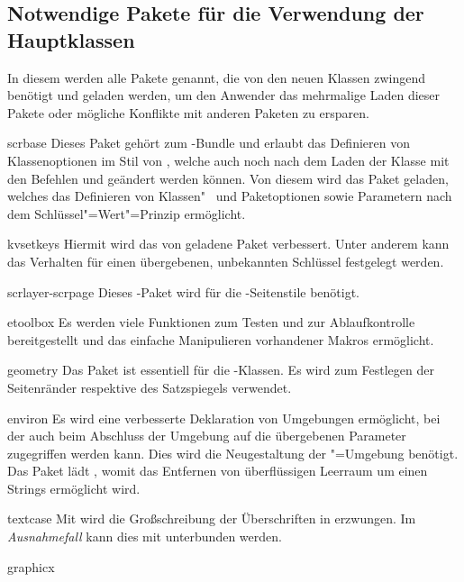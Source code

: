 \subsection{Notwendige Pakete für die Verwendung der Hauptklassen}
In diesem \autorefname werden alle Pakete genannt, die von den neuen Klassen 
zwingend benötigt und geladen werden, um den Anwender das mehrmalige Laden 
dieser Pakete oder mögliche Konflikte mit anderen Paketen zu ersparen.
%
\begin{packages}
\item[scrbase]
  Dieses Paket gehört zum \KOMAScript-Bundle und erlaubt das Definieren von 
  Klassenoptionen im Stil von \KOMAScript, welche auch noch nach dem Laden der 
  Klasse mit den Befehlen  und  geändert 
  werden können. Von diesem wird das Paket  geladen, welches 
  das Definieren von Klassen"~ und Paketoptionen sowie Parametern nach dem 
  Schlüssel"=Wert"=Prinzip ermöglicht.
\item[kvsetkeys]
  Hiermit wird das von  geladene Paket  
  verbessert. Unter anderem kann das Verhalten für einen übergebenen, 
  unbekannten Schlüssel festgelegt werden.
\item[scrlayer-scrpage]
  Dieses \KOMAScript-Paket wird für die -Seitenstile 
  benötigt.
\item[etoolbox]
  Es werden viele Funktionen zum Testen und zur Ablaufkontrolle bereitgestellt 
  und das einfache Manipulieren vorhandener Makros ermöglicht.
\item[geometry]
  Das Paket ist essentiell für die \TUDScript-Klassen. Es wird zum Festlegen 
  der Seitenränder respektive des Satzspiegels verwendet.
\item[environ]
  Es wird eine verbesserte Deklaration von Umgebungen ermöglicht, bei der auch 
  beim Abschluss der Umgebung auf die übergebenen Parameter zugegriffen werden 
  kann. Dies wird die Neugestaltung der "=Umgebung 
  benötigt. Das Paket lädt , womit das Entfernen von 
  überflüssigen Leerraum um einen Strings ermöglicht wird.
\item[textcase]
  Mit  wird die Großschreibung der Überschriften in 
  \DIN erzwungen. Im \emph{Ausnahmefall} kann dies mit  
  unterbunden werden.
\item[graphicx]

\end{packages}
